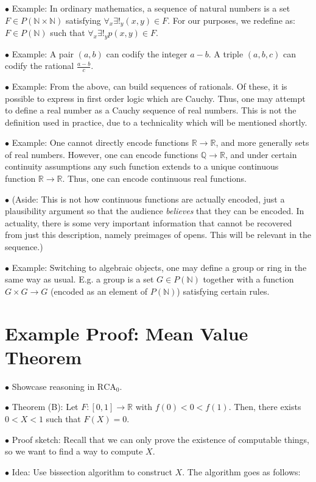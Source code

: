 \documentclass{article}
\theoremstyle{nonumberplain}
\newcommand{\N}{\mathbb{N}}
\newcommand{\Q}{\mathbb{Q}}
\newcommand{\R}{\mathbb{R}}
\newcommand{\RCA}{\mathrm{RCA}}
\newcommand\point[1]{\noindent \hspace{\labelsep} $\bullet$ #1 \smallskip}
\newcommand\timestamp[1]{}
\begin{document}
\point{Example: In ordinary mathematics, a sequence of natural numbers is a set $F \in P(\N \times \N)$ satisfying $\forall_x \exists!_y (x,y) \in F$. For our purposes, we redefine as: $F \in P(\N)$ such that $\forall_x \exists!_y p(x,y) \in F$.}

\point{Example: A pair $(a,b)$ can codify the integer $a-b$. A triple $(a,b,c)$ can codify the rational $\frac{a-b}c$.}

\point{Example: From the above, can build sequences of rationals. Of these, it is possible to express in first order logic which are Cauchy. Thus, one may attempt to define a real number as a Cauchy sequence of real numbers. This is not the definition used in practice, due to a technicality which will be mentioned shortly.}

\point{Example: One cannot directly encode functions $\R \to \R$, and more generally sets of real numbers. However, one can encode functions $\Q \to \R$, and under certain continuity assumptions any such function extends to a unique continuous function $\R \to \R$. Thus, one can encode continuous real functions.}

\point{(Aside: This is not how continuous functions are actually encoded, just a plausibility argument so that the audience \emph{believes} that they can be encoded. In actuality, there is some very important information that cannot be recovered from just this description, namely preimages of opens. This will be relevant in the sequence.)}

\point{Example: Switching to algebraic objects, one may define a group or ring in the same way as usual. E.g. a group is a set $G \in P(\N)$ together with a function $G \times G \to G$ (encoded as an element of $P(\N)$) satisfying certain rules.}

\timestamp{24 minutes}

\section{Example Proof: Mean Value Theorem}

\point{Showcase reasoning in $\RCA_0$.}

\point{Theorem (B): Let $F \colon [0,1] \to \R$ with $f(0) < 0 < f(1)$. Then, there exists $0 < X < 1$ such that $F(X) = 0$.}

\point{Proof sketch: Recall that we can only prove the existence of computable things, so we want to find a way to compute $X$.}

\point{Idea: Use bissection algorithm to construct $X$. The algorithm goes as follows:}
\end{document}
